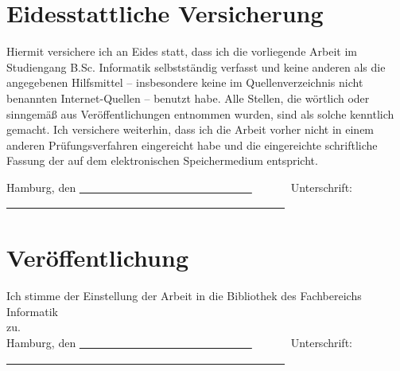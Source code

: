 	\chapter*{Eidesstattliche Versicherung}
\renewcommand*\chapterpagestyle{empty}
Hiermit versichere ich an Eides statt, dass ich die vorliegende Arbeit im Studiengang B.Sc. Informatik
selbstständig verfasst und keine anderen als die angegebenen Hilfsmittel – insbesondere keine im Quellenverzeichnis nicht benannten Internet-Quellen – benutzt habe.
Alle Stellen, die wörtlich oder sinngemäß aus Veröffentlichungen entnommen wurden, sind als solche kenntlich gemacht. 
Ich versichere weiterhin, dass ich die Arbeit vorher nicht in einem anderen Prüfungsverfahren eingereicht habe und die eingereichte schriftliche Fassung der auf dem elektronischen Speichermedium entspricht.
\vspace{1cm} 

\noindent Hamburg, den \uline{~~~~~~~~~~~~~~~~~~~~~~~~~~~~~~~}~~~~~~~Unterschrift: \uline{~~~~~~~~~~~~~~~~~~~~~~~~~~~~~~~~~~~~~~~~~~~~~~~~~~} 

\let \cleardoublepage \clearpage

\noindent\begin{minipage}{\textwidth}
	
\vspace{1cm} 
\chapter*{Veröffentlichung}
Ich stimme der Einstellung der Arbeit in die Bibliothek des Fachbereichs Informatik \\zu.
\vspace{1cm}\\ 
\noindent Hamburg, den \uline{~~~~~~~~~~~~~~~~~~~~~~~~~~~~~~~}~~~~~~~Unterschrift: \uline{~~~~~~~~~~~~~~~~~~~~~~~~~~~~~~~~~~~~~~~~~~~~~~~~~~}
\end{minipage}
